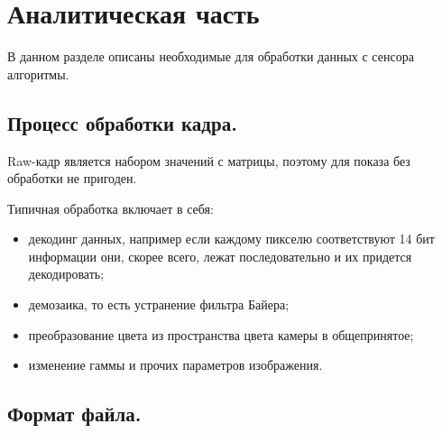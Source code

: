 \chapter{Аналитическая часть}

В данном разделе описаны необходимые для обработки данных с сенсора алгоритмы.

\section{Процесс обработки кадра.}

Raw-кадр является набором значений с матрицы, поэтому для показа без обработки не пригоден.

Типичная обработка включает в себя:
\begin{itemize}
	\item декодинг данных, например если каждому пикселю соответствуют 14 бит информации они, скорее всего, лежат последовательно и их придется декодировать;
	\item демозаика, то есть устранение фильтра Байера;
	\item преобразование цвета из пространства цвета камеры в общепринятое;
	\item изменение гаммы и прочих параметров изображения.
\end{itemize}


\section{Формат файла.}

\begin{table}[h]
	\begin{center}
		\caption{Используемая информация о изображении.}
		\label{tbl:log}
	\end{center}
\end{table}

